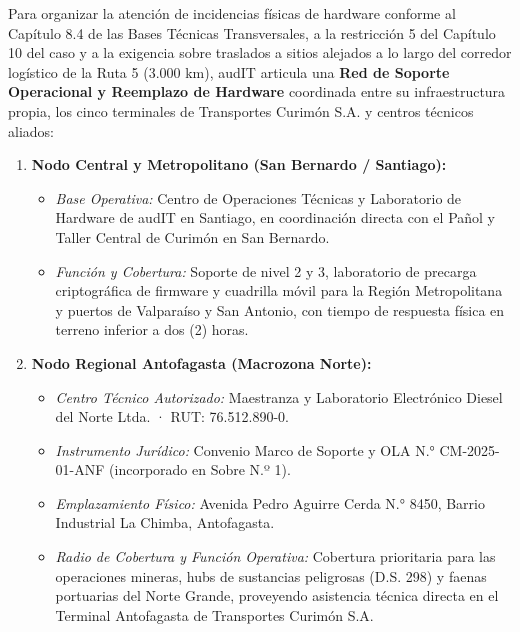 Para organizar la atención de incidencias físicas de hardware conforme al Capítulo 8.4 de las Bases Técnicas Transversales, a la restricción 5 del Capítulo 10 del caso y a la exigencia  sobre traslados a sitios alejados a lo largo del corredor logístico de la Ruta 5 (3.000 km), audIT articula una \textbf{Red de Soporte Operacional y Reemplazo de Hardware} coordinada entre su infraestructura propia, los cinco terminales de Transportes Curimón S.A. y centros técnicos aliados:

\begin{enumerate}
  \item \textbf{Nodo Central y Metropolitano (San Bernardo / Santiago):}
  \begin{itemize}
    \item \textit{Base Operativa:} Centro de Operaciones Técnicas y Laboratorio de Hardware de audIT en Santiago, en coordinación directa con el Pañol y Taller Central de Curimón en San Bernardo.
    \item \textit{Función y Cobertura:} Soporte de nivel 2 y 3, laboratorio de precarga criptográfica de firmware y cuadrilla móvil para la Región Metropolitana y puertos de Valparaíso y San Antonio, con tiempo de respuesta física en terreno inferior a dos (2) horas.
  \end{itemize}

  \item \textbf{Nodo Regional Antofagasta (Macrozona Norte):}
  \begin{itemize}
    \item \textit{Centro Técnico Autorizado:} Maestranza y Laboratorio Electrónico Diesel del Norte Ltda. · RUT: 76.512.890-0.
    \item \textit{Instrumento Jurídico:} Convenio Marco de Soporte y OLA N.° CM-2025-01-ANF (incorporado en Sobre N.º 1).
    \item \textit{Emplazamiento Físico:} Avenida Pedro Aguirre Cerda N.° 8450, Barrio Industrial La Chimba, Antofagasta.
    \item \textit{Radio de Cobertura y Función Operativa:} Cobertura prioritaria para las operaciones mineras, hubs de sustancias peligrosas (D.S. 298) y faenas portuarias del Norte Grande, proveyendo asistencia técnica directa en el Terminal Antofagasta de Transportes Curimón S.A.
  \end{itemize}


\end{enumerate}
